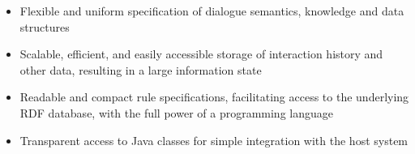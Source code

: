 \begin{itemize}
  \addtolength{\itemsep}{-.6\itemsep}
\item Flexible and uniform specification of dialogue semantics, knowledge and
  data structures
\item Scalable, efficient, and easily accessible storage of interaction history
  and other data, resulting in a large information state
\item Readable and compact rule specifications, facilitating access to the
  underlying RDF database, with the full power of a programming language
\item Transparent access to Java classes for simple integration with the host
  system
\end{itemize}
\fi

